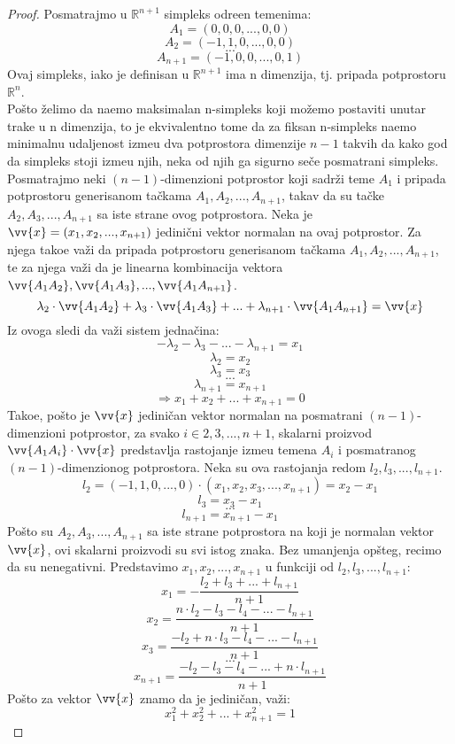 \documentclass[11pt,letter]{article}
\begin{document}
\begin{proof}
Posmatrajmo u $\mathbb{R}^{n+1}$ simpleks odre\dj en temenima:
$$A_1=(0, 0, 0, ..., 0, 0)$$
$$A_2=(-1, 1, 0, ..., 0, 0)$$
$$...$$
$$A_{n+1}=(-1,0,0,..., 0, 1)$$
Ovaj simpleks, iako je definisan u $\mathbb{R}^{n+1}$ ima n dimenzija, tj. pripada potprostoru $\mathbb{R}^n$. 
 \\
\indent Po\v sto \v zelimo da na\dj emo maksimalan n-simpleks koji mo\v zemo postaviti unutar trake u n dimenzija, to je ekvivalentno tome da za fiksan n-simpleks na\dj emo minimalnu udaljenost izme\dj u dva potprostora dimenzije $n-1$ takvih da kako god da simpleks stoji izme\dj u njih, neka od njih ga sigurno se\v ce posmatrani simpleks.
\\
\indent Posmatrajmo neki $(n-1)$-dimenzioni potprostor koji sadr\v zi teme $A_1$ i pripada potprostoru generisanom ta\v ckama $A_1, A_2,..., A_{n+1}$, takav da su ta\v cke $A_2, A_3,..., A_{n+1}$ sa iste strane ovog potprostora. Neka je $\vv{x}=(x_1, x_2,..., x_{n+1})$ jedini\v cni vektor normalan na ovaj potprostor. Za njega tako\dj e va\v zi da pripada potprostoru generisanom ta\v ckama $A_1, A_2,..., A_{n+1}$, te za njega va\v zi da je linearna kombinacija vektora $\vv{A_1A_2}, \vv{A_1A_3},...,\vv{A_1 A_{n+1}}$.
$$\lambda_2 \cdot \vv{A_1A_2}+\lambda_3 \cdot \vv{A_1A_3}+...+\lambda_{n+1}\cdot \vv{A_1A_{n+1}}=\vv{x}$$
Iz ovoga sledi da va\v zi sistem jedna\v cina:
$$ -\lambda_2-\lambda_3-...-\lambda_{n+1}=x_1$$
$$\lambda_2=x_2$$
$$\lambda_3=x_3$$
$$...$$
$$\lambda_{n+1}=x_{n+1}$$
$$\Rightarrow x_1+x_2+...+x_{n+1}=0 $$
Tako\dj e, po\v sto je $\vv{x}$ jedini\v can vektor normalan na posmatrani $(n-1)$-dimenzioni potprostor, za svako $i\in {2, 3,..., n+1}$, skalarni proizvod $\vv{A_1A_i}\cdot \vv{x}$ predstavlja rastojanje izme\dj u temena $A_i$ i posmatranog $(n-1)$-dimenzionog potprostora. Neka su ova rastojanja redom $l_2, l_3,..., l_{n+1}$.
$$l_2=(-1, 1, 0,..., 0)\cdot (x_1, x_2, x_3,..., x_{n+1})=x_2-x_1$$
$$l_3=x_3-x_1$$
$$...$$
$$l_{n+1}=x_{n+1}-x_1$$
Po\v sto su $A_2, A_3,..., A_{n+1}$ sa iste strane potprostora na koji je normalan vektor $\vv{x}$, ovi skalarni proizvodi su svi istog znaka. Bez umanjenja op\v steg, recimo da su nenegativni.
Predstavimo $x_1, x_2,..., x_{n+1}$ u funkciji od $l_2, l_3,..., l_{n+1}$:
$$x_1=-\frac{l_2+l_3+...+l_{n+1}}{n+1}$$
$$x_2=\frac{n\cdot l_2-l_3-l_4-...-l_{n+1}}{n+1}$$
$$x_3=\frac{-l_2+n\cdot l_3-l_4-...-l_{n+1}}{n+1}$$
$$...$$
$$x_{n+1}=\frac{-l_2-l_3-l_4-...+n\cdot l_{n+1}}{n+1}$$
\indent Po\v sto za vektor $\vv{x}$ znamo da je jedini\v can, va\v zi:
$$x_1^2+ x_2^2+...+x_{n+1}^2=1$$

\end{proof}
\end{document}
